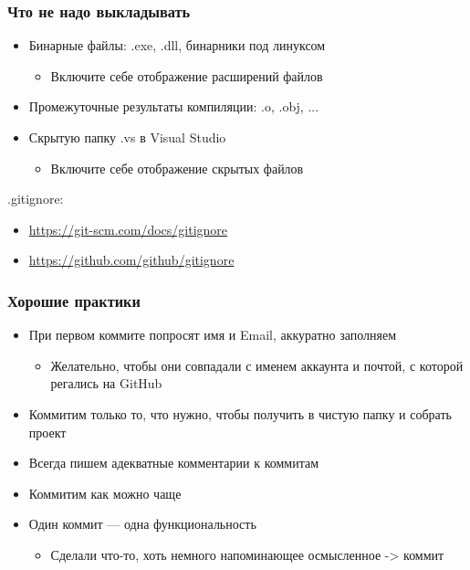 \documentclass[xetex,mathserif,serif]{beamer}
\begin{document}
    \begin{frame}
        \frametitle{Что не надо выкладывать}
        \begin{itemize}
            \item Бинарные файлы: .exe, .dll, бинарники под линуксом
            \begin{itemize}
                \item Включите себе отображение расширений файлов
            \end{itemize}
            \item Промежуточные результаты компиляции: .o, .obj, ...
            \item Скрытую папку .vs в Visual Studio
            \begin{itemize}
                \item Включите себе отображение скрытых файлов
            \end{itemize}
        \end{itemize}
        .gitignore:
        \begin{itemize}
            \item \url{https://git-scm.com/docs/gitignore}
            \item \url{https://github.com/github/gitignore}
        \end{itemize}
    \end{frame}

    \begin{frame}
        \frametitle{Хорошие практики}
        \begin{itemize}
            \item При первом коммите попросят имя и Email, аккуратно заполняем
            \begin{itemize}
                \item Желательно, чтобы они совпадали с именем аккаунта и почтой, с которой регались на GitHub
            \end{itemize}
            \item Коммитим только то, что нужно, чтобы получить в чистую папку и собрать проект
            \item Всегда пишем адекватные комментарии к коммитам
            \item Коммитим как можно чаще
            \item Один коммит --- одна функциональность
            \begin{itemize}
                \item Сделали что-то, хоть немного напоминающее осмысленное -> коммит
            \end{itemize}
        \end{itemize}
    \end{frame}
\end{document}
